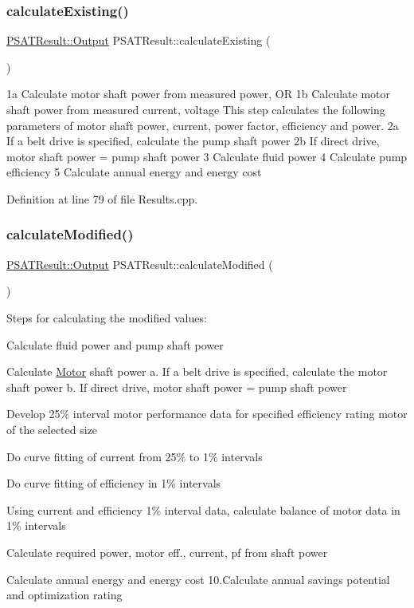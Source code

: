\subsubsection{\texorpdfstring{calculate\+Existing()}{calculateExisting()}}
{\footnotesize\ttfamily \hyperlink{struct_p_s_a_t_result_1_1_output}{P\+S\+A\+T\+Result\+::\+Output} P\+S\+A\+T\+Result\+::calculate\+Existing (\begin{DoxyParamCaption}{ }\end{DoxyParamCaption})}

1a Calculate motor shaft power from measured power, OR 1b Calculate motor shaft power from measured current, voltage This step calculates the following parameters of motor shaft power, current, power factor, efficiency and power. 2a If a belt drive is specified, calculate the pump shaft power 2b If direct drive, motor shaft power = pump shaft power 3 Calculate fluid power 4 Calculate pump efficiency 5 Calculate annual energy and energy cost

Definition at line 79 of file Results.\+cpp.

\mbox{\label{class_p_s_a_t_result_af36b7142891823698aa04bfae74288e8}} 
\subsubsection{\texorpdfstring{calculate\+Modified()}{calculateModified()}}
{\footnotesize\ttfamily \hyperlink{struct_p_s_a_t_result_1_1_output}{P\+S\+A\+T\+Result\+::\+Output} P\+S\+A\+T\+Result\+::calculate\+Modified (\begin{DoxyParamCaption}{ }\end{DoxyParamCaption})}

Steps for calculating the modified values\+:
\begin{DoxyEnumerate}
\item Calculate fluid power and pump shaft power
\item Calculate \hyperlink{struct_motor}{Motor} shaft power a. If a belt drive is specified, calculate the motor shaft power b. If direct drive, motor shaft power = pump shaft power
\item Develop 25\% interval motor performance data for specified efficiency rating motor of the selected size
\item Do curve fitting of current from 25\% to 1\% intervals
\item Do curve fitting of efficiency in 1\% intervals
\item Using current and efficiency 1\% interval data, calculate balance of motor data in 1\% intervals
\item Calculate required power, motor eff., current, pf from shaft power
\item Calculate annual energy and energy cost 10.\+Calculate annual savings potential and optimization rating
\end{DoxyEnumerate}

